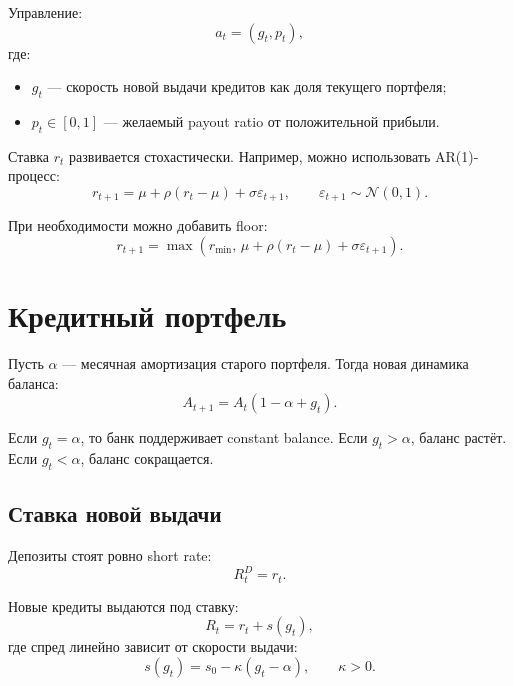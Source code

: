 \documentclass[11pt,a4paper]{article}
\newcommand{\1}{\mathbf{1}}
\begin{document}
Управление:
\begin{equation}
    a_t = (g_t, p_t),
\end{equation}
где:
\begin{itemize}[noitemsep]
    \item $g_t$ --- скорость новой выдачи кредитов как доля текущего портфеля;
    \item $p_t \in [0,1]$ --- желаемый payout ratio от положительной прибыли.
\end{itemize}

Ставка $r_t$ развивается стохастически. Например, можно использовать AR(1)-процесс:
\begin{equation}
    r_{t+1} = \mu + \rho(r_t-\mu) + \sigma \varepsilon_{t+1},
    \qquad \varepsilon_{t+1}\sim\mathcal{N}(0,1).
\end{equation}

При необходимости можно добавить floor:
\begin{equation}
    r_{t+1} = \max\left(r_{\min},\, \mu + \rho(r_t-\mu)+\sigma\varepsilon_{t+1}\right).
\end{equation}

\section{Кредитный портфель}

Пусть $\alpha$ --- месячная амортизация старого портфеля. Тогда новая динамика баланса:
\begin{equation}
    A_{t+1} = A_t(1-\alpha+g_t).
\end{equation}

Если $g_t=\alpha$, то банк поддерживает constant balance. Если $g_t>\alpha$, баланс растёт. Если $g_t<\alpha$, баланс сокращается.

\subsection{Ставка новой выдачи}

Депозиты стоят ровно short rate:
\begin{equation}
    R_t^D = r_t.
\end{equation}

Новые кредиты выдаются под ставку:
\begin{equation}
    R_t = r_t + s(g_t),
\end{equation}
где спред линейно зависит от скорости выдачи:
\begin{equation}
    s(g_t) = s_0 - \kappa(g_t-\alpha), \qquad \kappa>0.
\end{equation}
\end{document}
